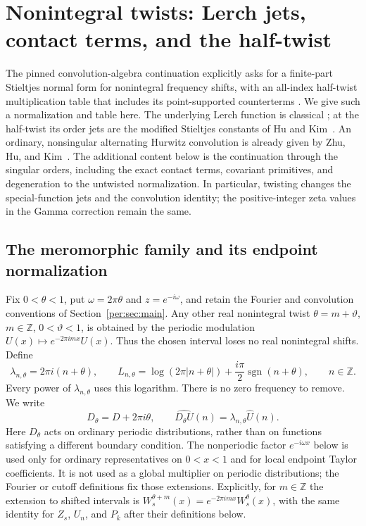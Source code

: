 \documentclass[11pt,letterpaper]{article}
\numberwithin{equation}{section}
\theoremstyle{plain}
\theoremstyle{definition}
\theoremstyle{remark}
\begin{document}


\section{Nonintegral twists: Lerch jets, contact terms, and the half-twist}
\label{tw:sec:main}

The pinned convolution-algebra continuation explicitly asks for a
finite-part Stieltjes normal form for nonintegral frequency shifts, with
an all-index half-twist multiplication table that includes its
point-supported counterterms
\cite[``Twists, characters, and alternate endpoint normalizations'']{RepoConvolutionAlgebra}.
We give such a normalization and table here. The underlying Lerch
function is classical \cite[\S25.14]{DLMFLerch}; at the half-twist its
order jets are the modified Stieltjes constants of Hu and
Kim~\cite{HuKim2022}. An ordinary, nonsingular alternating Hurwitz
convolution is already given by Zhu, Hu, and
Kim~\cite[Theorem~1.13]{ZhuHuKim2026}. The additional content below is
the continuation through the singular orders, including the exact
contact terms, covariant primitives, and degeneration to the untwisted
normalization. In particular, twisting changes the special-function
jets and the convolution identity; the positive-integer zeta values in
the Gamma correction remain the same.

\subsection{The meromorphic family and its endpoint normalization}

Fix $0<\theta<1$, put $\omega=2\pi\theta$ and $z=e^{-i\omega}$, and
retain the Fourier and convolution conventions of
Section~\ref{per:sec:main}. Any other real nonintegral twist
$\theta=m+\vartheta$, $m\in\mathbb Z$, $0<\vartheta<1$, is obtained
by the periodic modulation $U(x)\mapsto e^{-2\pi imx}U(x)$.
Thus the chosen interval loses no real nonintegral shifts. Define
\begin{equation}\label{tw:eq:lambda}
 \lambda_{n,\theta}=2\pi i(n+\theta),\qquad
 L_{n,\theta}=\log(2\pi|n+\theta|)
                      +\frac{i\pi}{2}\operatorname{sgn}(n+\theta),
 \qquad n\in\mathbb Z.
\end{equation}
Every power of $\lambda_{n,\theta}$ uses this logarithm. There is no
zero frequency to remove. We write
\[
 D_\theta=D+2\pi i\theta,
 \qquad \widehat{D_\theta U}(n)=\lambda_{n,\theta}\widehat U(n).
\]
Here $D_\theta$ acts on ordinary periodic distributions, rather than on
functions satisfying a different boundary condition.
The nonperiodic factor $e^{-i\omega x}$ below is used only for
ordinary representatives on $0<x<1$ and for local endpoint Taylor
coefficients. It is not used as a global multiplier on periodic
distributions; the Fourier or cutoff definitions fix those extensions.
Explicitly, for $m\in\mathbb Z$ the extension to shifted intervals is
$W_s^{\theta+m}(x)=e^{-2\pi imx}W_s^\theta(x)$, with the same identity
for $Z_s$, $U_n$, and $P_k$ after their definitions below.
\end{document}
